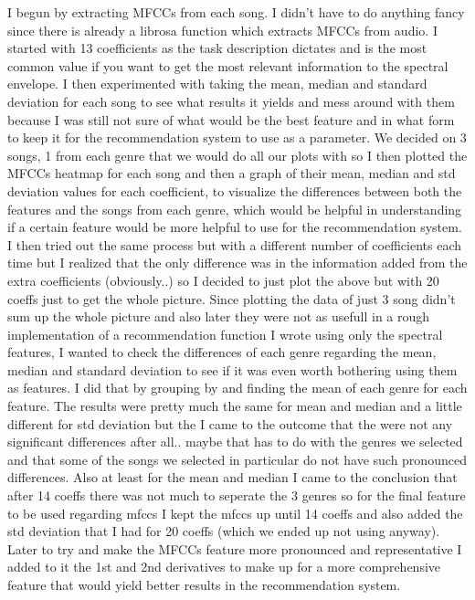 \documentclass[
  letterpaper,
  twocolumn]{article}
\begin{document}
I begun by extracting MFCCs from each song. I didn't have to do anything
fancy since there is already a librosa function which extracts MFCCs
from audio. I started with 13 coefficients as the task description
dictates and is the most common value if you want to get the most
relevant information to the spectral envelope. I then experimented with
taking the mean, median and standard deviation for each song to see what
results it yields and mess around with them because I was still not sure
of what would be the best feature and in what form to keep it for the
recommendation system to use as a parameter. We decided on 3 songs, 1
from each genre that we would do all our plots with so I then plotted
the MFCCs heatmap for each song and then a graph of their mean, median
and std deviation values for each coefficient, to visualize the
differences between both the features and the songs from each genre,
which would be helpful in understanding if a certain feature would be
more helpful to use for the recommendation system. I then tried out the
same process but with a different number of coefficients each time but I
realized that the only difference was in the information added from the
extra coefficients (obviously..) so I decided to just plot the above but
with 20 coeffs just to get the whole picture. Since plotting the data of
just 3 song didn't sum up the whole picture and also later they were not
as usefull in a rough implementation of a recommendation function I
wrote using only the spectral features, I wanted to check the
differences of each genre regarding the mean, median and standard
deviation to see if it was even worth bothering using them as features.
I did that by grouping by and finding the mean of each genre for each
feature. The results were pretty much the same for mean and median and a
little different for std deviation but the I came to the outcome that
the were not any significant differences after all.. maybe that has to
do with the genres we selected and that some of the songs we selected in
particular do not have such pronounced differences. Also at least for
the mean and median I came to the conclusion that after 14 coeffs there
was not much to seperate the 3 genres so for the final feature to be
used regarding mfccs I kept the mfccs up until 14 coeffs and also added
the std deviation that I had for 20 coeffs (which we ended up not using
anyway). Later to try and make the MFCCs feature more pronounced and
representative I added to it the 1st and 2nd derivatives to make up for
a more comprehensive feature that would yield better results in the
recommendation system.
\end{document}
